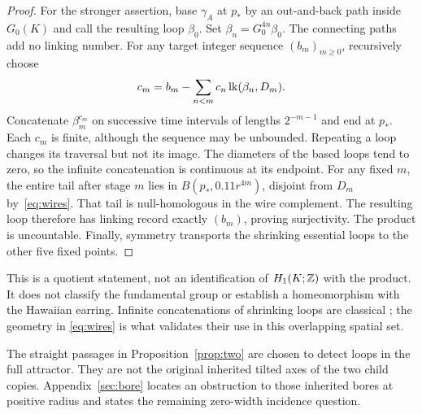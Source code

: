 \begin{proof}
For the stronger assertion, base $\gamma_A$ at $p_*$ by an out-and-back path
inside $G_0(K)$ and call the resulting loop $\beta_0$.
Set $\beta_n=G_0^{4n}\beta_0$. The connecting paths add no linking number.
For any target integer sequence $(b_m)_{m\ge0}$, recursively choose
\[
c_m=b_m-\sum_{n<m}c_n\operatorname{lk}(\beta_n,D_m).
\]
Concatenate $\beta_m^{c_m}$ on successive time intervals of lengths
$2^{-m-1}$ and end at $p_*$. Each $c_m$ is finite, although the sequence
may be unbounded. Repeating a loop changes its traversal but not its image.
The diameters of the based loops tend to zero, so the
infinite concatenation is continuous at its endpoint.
For any fixed $m$, the entire tail after stage $m$ lies in
$B(p_*,0.11r^{4m})$, disjoint from $D_m$ by~\eqref{eq:wires}.
That tail is null-homologous in the wire complement. The resulting loop
therefore has linking record exactly $(b_m)$, proving surjectivity.
The product is uncountable. Finally, symmetry transports the shrinking
essential loops to the other five fixed points.
\end{proof}

This is a quotient statement, not an identification of $H_1(K;\mathbb Z)$ with
the product. It does not classify the fundamental group or establish a
homeomorphism with the Hawaiian earring. Infinite concatenations of shrinking
loops are classical \cite[Example 1.25]{hatcher}; the geometry in
\eqref{eq:wires} is what validates their use in this overlapping spatial set.

The straight passages in Proposition~\ref{prop:two} are chosen to detect
loops in the full attractor. They are not the original inherited tilted
axes of the two child copies. Appendix~\ref{sec:bore} locates an obstruction
to those inherited bores at positive radius and states the remaining
zero-width incidence question.
